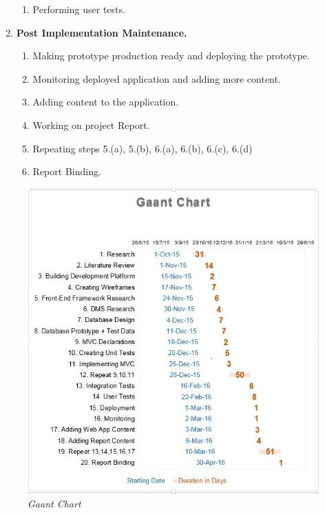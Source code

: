 \documentclass[12pt,twoside,a4paper]{report}
\begin{document}
\begin{enumerate}
\begin{enumerate}
	\item Performing user tests.
	\end{enumerate}
\item \textbf{Post Implementation Maintenance.}
	\begin{enumerate}\itemsep1pt \parskip0pt 
	\item Making prototype production ready and deploying the prototype.
	\item Monitoring deployed application and adding more content.
	\item Adding content to the application.
	\item Working on project Report.
	\item Repeating steps 5.(a), 5.(b), 6.(a), 6.(b), 6.(c), 6.(d)
	\item Report Binding.
	\end{enumerate}
\end{enumerate}
\begin{figure}[!ht]
	\centering
		\includegraphics[width=1\textwidth,totalheight=10cm]{gaant}
	\caption{\textit{Gaant Chart}}
	\label{f1.2}
\end{figure}

\end{document}
